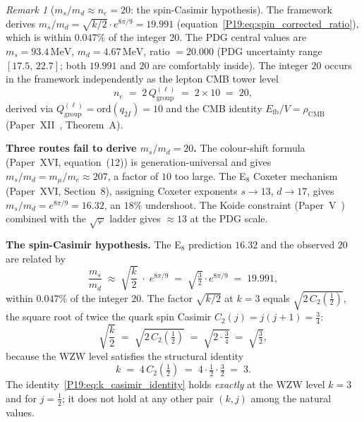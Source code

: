 \documentclass[11pt,a4paper]{article}
\theoremstyle{definition}\newtheorem{definition}[theorem]{Definition}
\theoremstyle{remark}
\newtheorem{remark}[theorem]{Remark}
\newcommand{\vp}{\varphi}
\newcommand{\rCMB}{\rho_{\mathrm{CMB}}}
\newcommand{\Efb}{E_{\mathrm{fb}}}
\begin{document}
\begin{remark}[$m_s/m_d \approx n_e = 20$: the spin-Casimir hypothesis]
\label{P19:rem:ms_md_integer}
The framework derives $m_s/m_d = \sqrt{k/2}\cdot e^{8\pi/9}=19.991$
(equation~\eqref{P19:eq:spin_corrected_ratio}), which is within $0.047\%$
of the integer $20$.  The PDG central values are
$m_s=93.4\,\mathrm{MeV}$, $m_d=4.67\,\mathrm{MeV}$, ratio $=20.000$
(PDG uncertainty range $[17.5,\,22.7]$; both $19.991$ and $20$ are
comfortably inside).  The integer $20$ occurs in the framework
independently as the lepton CMB tower level
\begin{equation}
  n_e \;=\; 2\,Q_{\mathrm{group}}^{(\ell)} \;=\; 2\times10 \;=\; 20,
  \label{P19:eq:ne_20}
\end{equation}
derived via $Q_{\mathrm{group}}^{(\ell)}=\mathrm{ord}(q_{2I})=10$
and the CMB identity $\Efb/V=\rCMB$
(Paper~XII~\cite{Paper12}, Theorem~A). %

\textbf{Three routes fail to derive $m_s/m_d=20$.}
The colour-shift formula (Paper~XVI, equation~(12)) %
is generation-universal and gives $m_s/m_d = m_\mu/m_e\approx207$,
a factor of $10$ too large.  The E$_8$ Coxeter mechanism
(Paper~XVI, Section~8), assigning Coxeter exponents $s\to13$,
$d\to17$, gives $m_s/m_d=e^{8\pi/9}=16.32$, an $18\%$ undershoot.
The Koide constraint (Paper~V~\cite{Paper5}) combined with the
$\sqrt{\vp}$ ladder gives $\approx13$ at the PDG scale.

\textbf{The spin-Casimir hypothesis.}
The E$_8$ prediction $16.32$ and the observed $20$ are related by
\begin{equation}
  \frac{m_s}{m_d}
  \;\approx\;
  \sqrt{\frac{k}{2}}\;\cdot\; e^{8\pi/9}
  \;=\; \sqrt{\tfrac32}\cdot e^{8\pi/9}
  \;=\; 19.991,
  \label{P19:eq:spin_corrected_ratio}
\end{equation}
within $0.047\%$ of the integer $20$.
The factor $\sqrt{k/2}$ at $k=3$ equals $\sqrt{2\,C_2(\tfrac12)}$,
the square root of twice the quark spin Casimir
$C_2(j)=j(j+1)=\tfrac34$:
\begin{equation}
  \sqrt{\frac{k}{2}} \;=\; \sqrt{2\,C_2\!\left(\tfrac12\right)}
  \;=\; \sqrt{2\cdot\tfrac34}
  \;=\; \sqrt{\tfrac32},
  \label{P19:eq:spin_casimir_id}
\end{equation}
because the WZW level satisfies the structural identity
\begin{equation}
  k \;=\; 4\,C_2\!\left(\tfrac12\right)
  \;=\; 4\cdot\tfrac12\cdot\tfrac32
  \;=\; 3.
  \label{P19:eq:k_casimir_identity}
\end{equation}
The identity~\eqref{P19:eq:k_casimir_identity} holds
\emph{exactly} at the WZW level $k=3$ and for $j=\tfrac12$; it
does not hold at any other pair $(k,j)$ among the natural values.


\end{remark}
\end{document}
